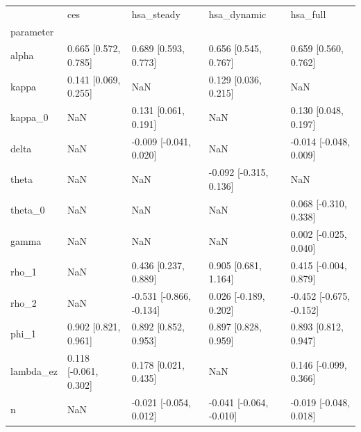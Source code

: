 \begin{tabular}{lllll}
\toprule
 & ces & hsa\_steady & hsa\_dynamic & hsa\_full \\
parameter &  &  &  &  \\
\midrule
alpha & 0.665 [0.572, 0.785] & 0.689 [0.593, 0.773] & 0.656 [0.545, 0.767] & 0.659 [0.560, 0.762] \\
kappa & 0.141 [0.069, 0.255] & NaN & 0.129 [0.036, 0.215] & NaN \\
kappa\_0 & NaN & 0.131 [0.061, 0.191] & NaN & 0.130 [0.048, 0.197] \\
delta & NaN & -0.009 [-0.041, 0.020] & NaN & -0.014 [-0.048, 0.009] \\
theta & NaN & NaN & -0.092 [-0.315, 0.136] & NaN \\
theta\_0 & NaN & NaN & NaN & 0.068 [-0.310, 0.338] \\
gamma & NaN & NaN & NaN & 0.002 [-0.025, 0.040] \\
rho\_1 & NaN & 0.436 [0.237, 0.889] & 0.905 [0.681, 1.164] & 0.415 [-0.004, 0.879] \\
rho\_2 & NaN & -0.531 [-0.866, -0.134] & 0.026 [-0.189, 0.202] & -0.452 [-0.675, -0.152] \\
phi\_1 & 0.902 [0.821, 0.961] & 0.892 [0.852, 0.953] & 0.897 [0.828, 0.959] & 0.893 [0.812, 0.947] \\
lambda\_ez & 0.118 [-0.061, 0.302] & 0.178 [0.021, 0.435] & NaN & 0.146 [-0.099, 0.366] \\
n & NaN & -0.021 [-0.054, 0.012] & -0.041 [-0.064, -0.010] & -0.019 [-0.048, 0.018] \\
\bottomrule
\end{tabular}
